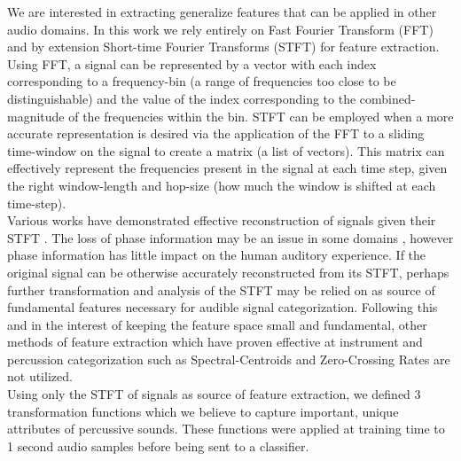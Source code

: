 \documentclass{nime-alternate} %
\begin{document}
We are interested in extracting generalize features that can be applied in other audio domains. In this work we rely entirely on Fast Fourier Transform (FFT) and by extension Short-time Fourier Transforms (STFT) for feature extraction. Using FFT, a signal can be represented by a vector with each index corresponding to a frequency-bin (a range of frequencies too close to be distinguishable) and the value of the index corresponding to the combined-magnitude of the frequencies within the bin. STFT can be employed when a more accurate representation is desired via the application of the FFT to a sliding time-window on the signal to create a matrix (a list of vectors). This matrix can effectively represent the frequencies present in the signal at each time step, given the right window-length and hop-size (how much the window is shifted at each time-step).\\
Various works have demonstrated effective reconstruction of signals given their STFT \cite{nawab1983signal,griffin1984signal}. The loss of phase information may be an issue in some domains \cite{sturmel2011signal}, however phase information has little impact on the human auditory experience. If the original signal can be otherwise accurately reconstructed from its STFT, perhaps further transformation and analysis of the STFT may be relied on as source of fundamental features necessary for audible signal categorization. Following this and in the interest of keeping the feature space small and fundamental, other methods of feature extraction which have proven effective at instrument and percussion categorization such as Spectral-Centroids \cite{schubert2004spectral} and Zero-Crossing Rates \cite{gouyon2000use} are not utilized.\\
Using only the STFT of signals as source of feature extraction, we defined 3 transformation functions which we believe to capture important, unique attributes of percussive sounds. These functions were applied at training time to 1 second audio samples before being sent to a classifier. 
\end{document}
